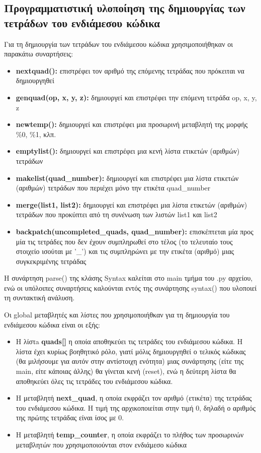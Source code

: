 \documentclass[12pt,a4paper]{article}
\begin{document}
\subsection{Προγραμματιστική υλοποίηση της δημιουργίας των τετράδων του ενδιάμεσου κώδικα}
Για τη δημιουργία των τετράδων του ενδιάμεσου κώδικα χρησιμοποιήθηκαν οι παρακάτω συναρτήσεις:
\begin{itemize}
    \item \textbf{nextquad():} επιστρέφει τον αριθμό της επόμενης τετράδας που πρόκειται να δημιουργηθεί

    \item \textbf{genquad(op, x, y, z):} δημιουργεί και επιστρέφει την επόμενη τετράδα op, x, y, z

    \item \textbf{newtemp():} δημιουργεί και επιστρέφει μια προσωρινή μεταβλητή της μορφής \%0, \%1, κλπ.
    \item \textbf{emptylist():} δημιουργεί και επιστρέφει μια κενή λίστα ετικετών (αριθμών) τετράδων
    \item \textbf{makelist(quad\_number):} δημιουργεί και επιστρέφει μια λίστα ετικετών (αριθμών) τετράδων που περιέχει μόνο την ετικέτα quad\_number
    \item \textbf{merge(list1, list2):} δημιουργεί και επιστρέφει μια λίστα ετικετών (αριθμών) τετράδων που προκύπτει από τη συνένωση των λιστών list1 και list2
    \item \textbf{backpatch(uncompleted\_quads, quad\_number):} επισκέπτεται μία προς μία τις τετράδες που δεν έχουν συμπληρωθεί στο τέλος (το τελευταίο τους στοιχείο ισούται με '\_') και τις συμπληρώνει με την ετικέτα (αριθμό) μιας συγκεκριμένης τετράδας
\end{itemize}

Η συνάρτηση parse() της κλάσης Syntax καλείται στο main τμήμα του .py αρχείου, ενώ οι υπόλοιπες συναρτήσεις καλούνται εντός της συνάρτησης syntax() που υλοποιεί τη συντακτική ανάλυση.

Οι global μεταβλητές και λίστες που χρησιμοποιήθκαν για τη δημιουργία του ενδιάμεσου κώδικα είναι οι εξής:
\begin{itemize}
    \item H λίστa \textbf{quads[]} η οποία αποθηκεύει τις τετράδες του ενδιάμεσου κώδικα. Η λίστα έχει κυρίως βοηθητικό ρόλο, γιατί μόλις δημιουργηθεί ο τελικός κώδικας (θα μιλήσουμε για αυτόν στην αντίστοιχη ενότητα) μιας συνάρτησης (είτε της main, είτε κάποιας άλλης) θα γίνεται κενή (reset), ενώ η δεύτερη λίστα θα αποθηκεύει όλες τις τετράδες του ενδιάμεσου κώδικα.
    \item Η μεταβλητή \textbf{next\_quad}, η οποία εκφράζει τον αριθμό (ετικέτα) της τετράδας του ενδιάμεσου κώδικα. Η τιμή της αρχικοποιείται στην τιμή 0, δηλαδή ο αριθμός της πρώτης τετράδας είναι ίσος με 0.
    \item Η μεταβλητή \textbf{temp\_counter}, η οποία εκφράζει το πλήθος των προσωρινών μεταβλητών που χρησιμοποιούνται στον ενδιάμεσο κώδικα
\end{itemize}
\end{document}
